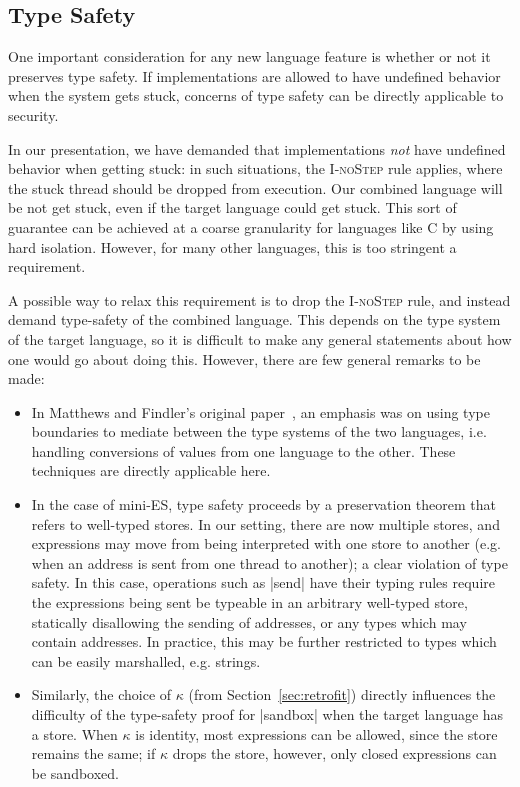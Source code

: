 \subsection{Type Safety}
\label{sec:extensions:types}

One important consideration for any new language feature is whether
or not it preserves type safety.  If implementations are allowed to
have undefined behavior when the system gets stuck, concerns of type
safety can be directly applicable to security.

In our presentation, we have demanded that implementations \emph{not}
have undefined behavior when getting stuck: in such situations, the
\textsc{I-noStep} rule applies, where the stuck thread should be dropped
from execution.  Our combined language will be not get stuck, even if
the target language could get stuck.  This sort of guarantee can be
achieved at a coarse granularity for languages like C by using hard
isolation.  However, for many other languages, this is too stringent a
requirement.

A possible way to relax this requirement is to drop the \textsc{I-noStep}
rule, and instead demand type-safety of the combined language.  This
depends on the type system of the target language, so it is difficult to
make any general statements about how one would go about doing this.  However,
there are few general remarks to be made:

\begin{itemize}
    \item In Matthews and Findler's original
        paper~\cite{Matthews:2007:OSM:1190216.1190220}, an emphasis was
        on using type boundaries to mediate between the type systems of
        the two languages, i.e. handling conversions of values from
        one language to the other.  These techniques are directly applicable here.

    \item In the case of mini-ES, type safety proceeds by a preservation theorem
        that refers to well-typed stores.  In our setting, there are now multiple
        stores, and expressions may move from being interpreted with one store
        to another (e.g. when an address is sent from one thread to
        another); a clear violation of type safety.  In this case, operations
        such as |send| have their typing rules require
        the expressions being sent be typeable in an arbitrary well-typed store,
        statically disallowing the sending of addresses, or any types which
        may contain addresses.  In practice, this may be further restricted to
        types which can be easily marshalled, e.g. strings.

    \item Similarly, the choice of $\kappa$ (from Section~\ref{sec:retrofit}) directly
        influences the difficulty of the type-safety proof for
        |sandbox| when the target language has a store.  When
        $\kappa$ is identity, most expressions can be allowed, since the store
        remains the same; if $\kappa$ drops the store, however, only closed expressions
        can be sandboxed.
\end{itemize}

